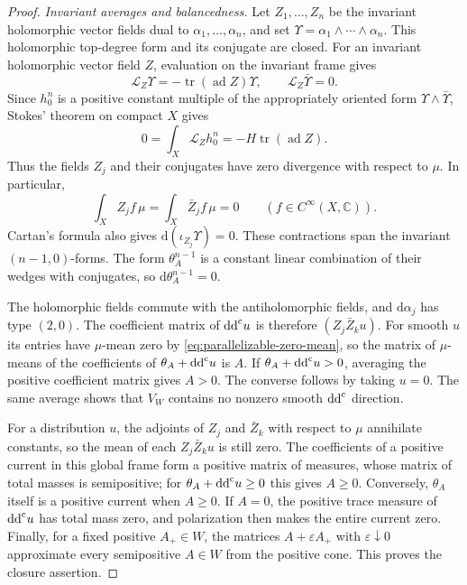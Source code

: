\begin{proof}
\emph{Invariant averages and balancedness.}
Let $Z_1,\ldots,Z_n$ be the invariant holomorphic vector fields dual to $\alpha_1,\ldots,\alpha_n$, and set $\Upsilon=\alpha_1\wedge\cdots\wedge\alpha_n$. This holomorphic top-degree form and its conjugate are closed. For an invariant holomorphic vector field $Z$, evaluation on the invariant frame gives
\[
 \mathcal L_Z\Upsilon=-\operatorname{tr}(\operatorname{ad}Z)\Upsilon,
 \qquad \mathcal L_Z\bar\Upsilon=0.
\]
Since $h_0^n$ is a positive constant multiple of the appropriately oriented form $\Upsilon\wedge\bar\Upsilon$, Stokes' theorem on compact $X$ gives
\[
 0=\int_X\mathcal L_Zh_0^n=-H\operatorname{tr}(\operatorname{ad}Z).
\]
Thus the fields $Z_j$ and their conjugates have zero divergence with respect to $\mu$. In particular,
\begin{equation}\label{eq:parallelizable-zero-mean}
 \int_XZ_jf\,\mu=\int_X\bar Z_jf\,\mu=0
 \qquad(f\in C^\infty(X,\mathbb C)).
\end{equation}
Cartan's formula also gives $\mathrm d(\iota_{Z_j}\Upsilon)=0$. These contractions span the invariant $(n-1,0)$-forms. The form $\theta_A^{n-1}$ is a constant linear combination of their wedges with conjugates, so $\mathrm d\theta_A^{n-1}=0$.

The holomorphic fields commute with the antiholomorphic fields, and $\mathrm d\alpha_j$ has type $(2,0)$. The coefficient matrix of $\mathrm{dd}^{\mathrm{c}} u$ is therefore $(Z_j\bar Z_k u)$. For smooth $u$ its entries have $\mu$-mean zero by \eqref{eq:parallelizable-zero-mean}, so the matrix of $\mu$-means of the coefficients of $\theta_A+\mathrm{dd}^{\mathrm{c}} u$ is $A$. If $\theta_A+\mathrm{dd}^{\mathrm{c}} u>0$, averaging the positive coefficient matrix gives $A>0$. The converse follows by taking $u=0$. The same average shows that $V_W$ contains no nonzero smooth $\mathrm{dd}^{\mathrm{c}}$ direction.

For a distribution $u$, the adjoints of $Z_j$ and $\bar Z_k$ with respect to $\mu$ annihilate constants, so the mean of each $Z_j\bar Z_k u$ is still zero. The coefficients of a positive current in this global frame form a positive matrix of measures, whose matrix of total masses is semipositive; for $\theta_A+\mathrm{dd}^{\mathrm{c}} u\geq0$ this gives $A\geq0$. Conversely, $\theta_A$ itself is a positive current when $A\geq0$. If $A=0$, the positive trace measure of $\mathrm{dd}^{\mathrm{c}} u$ has total mass zero, and polarization then makes the entire current zero. Finally, for a fixed positive $A_+\in W$, the matrices $A+\varepsilon A_+$ with $\varepsilon\downarrow0$ approximate every semipositive $A\in W$ from the positive cone. This proves the closure assertion.


\end{proof}
